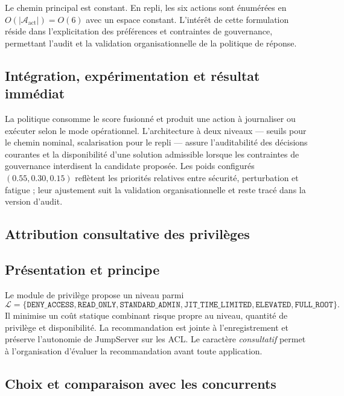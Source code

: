 \documentclass[11pt,a4paper,oneside]{report}
\theoremstyle{definition}
\theoremstyle{plain}
\begin{document}
Le chemin principal est constant. En repli, les six actions sont énumérées en
$O(|\mathcal{A}_{\mathrm{act}}|)=O(6)$ avec un espace constant. L'intérêt de cette
formulation réside dans l'explicitation des préférences et contraintes de
gouvernance, permettant l'audit et la validation organisationnelle de la politique
de réponse.

\subsection*{Intégration, expérimentation et résultat immédiat}

La politique consomme le score fusionné et produit une action à journaliser ou
exécuter selon le mode opérationnel. L'architecture à deux niveaux --- seuils
pour le chemin nominal, scalarisation pour le repli --- assure l'auditabilité
des décisions courantes et la disponibilité d'une solution admissible lorsque
les contraintes de gouvernance interdisent la candidate proposée. Les poids
configurés $(0.55,0.30,0.15)$ reflètent les priorités relatives entre sécurité,
perturbation et fatigue ; leur ajustement suit la validation organisationnelle
et reste tracé dans la version d'audit.

\subsection{Attribution consultative des privilèges}
\label{sec:ai-ro-privilege}

\subsection*{Présentation et principe}

Le module de privilège propose un niveau parmi
\[
\mathcal{L}=\{\texttt{DENY\_ACCESS},\texttt{READ\_ONLY},
\texttt{STANDARD\_ADMIN},\texttt{JIT\_TIME\_LIMITED},
\texttt{ELEVATED},\texttt{FULL\_ROOT}\}.
\]
Il minimise un coût statique combinant risque propre au niveau, quantité de
privilège et disponibilité. La recommandation est jointe à l'enregistrement et
préserve l'autonomie de JumpServer sur les ACL. Le caractère \emph{consultatif}
permet à l'organisation d'évaluer la recommandation avant toute application.

\subsection*{Choix et comparaison avec les concurrents}
\end{document}
